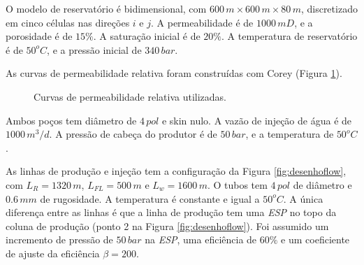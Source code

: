 \documentclass[final,5p]{elsarticle}
\numberwithin{equation}{section}
\begin{document}
        O modelo de reservatório é bidimensional, com $600\,m \times 600\,m \times 80\,m $, discretizado em cinco células nas direções $i$ e $j$. A permeabilidade é de $1000\,mD$, e a porosidade é de $15\%$. A saturação inicial é de $20\%$. A temperatura de reservatório é de $50^oC$, e a pressão inicial de $340\,bar$.

        As curvas de permeabilidade relativa foram construídas com Corey (Figura \ref{fig:kr}).

        \begin{figure}[hbt!]
            \caption{Curvas de permeabilidade relativa utilizadas.}
            \label{fig:kr}
        \end{figure}

        Ambos poços tem diâmetro de $4\,pol$ e skin nulo. A vazão de injeção de água é de $1000\,m^3/d$. A pressão de cabeça do produtor é de $50\,bar$, e a temperatura de $50^oC$.

        As linhas de produção e injeção tem a configuração da Figura \ref{fig:desenhoflow}, com $L_R = 1320\,m$, $L_{FL} = 500\,m$ e $L_w = 1600\,m$. O tubos tem $4\,pol$ de diâmetro e $0.6\,mm$ de rugosidade. A temperatura é constante e igual a $50^oC$. A única diferença entre as linhas é que a linha de produção tem uma \emph{ESP} no topo da coluna de produção (ponto 2 na Figura \ref{fig:desenhoflow}). Foi assumido um incremento de pressão de $50\,bar$ na \emph{ESP}, uma eficiência de $60\%$ e um coeficiente de ajuste da eficiência $\beta = 200$.
\end{document}
